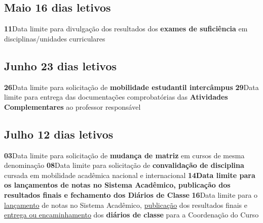 \documentclass[thesis]{hmcposter}
\begin{document}
\begin{poster}
\subsection{Maio \hfill 16 dias letivos}\textbf{11}\qquad Data limite para divulgação dos resultados dos \textbf{exames de suficiência} em disciplinas/unidades curriculares \newline \null\subsection{Junho \hfill 23 dias letivos}\textbf{26}\qquad Data limite para solicitação de \textbf{mobilidade estudantil intercâmpus} \newline \null\textbf{29}\qquad Data limite para entrega das documentações comprobatórias das \textbf{Atividades Complementares} ao professor responsável \newline \null\subsection{Julho \hfill 12 dias letivos}\textbf{03}\qquad Data limite para solicitação de \textbf{mudança de matriz} em cursos de mesma denominação \newline \null\textbf{08}\qquad Data limite para solicitação de \textbf{convalidação de disciplina} cursada em mobilidade acadêmica nacional e internacional \newline \null\textbf{14}\qquad \textbf{Data limite para os lançamentos de notas no Sistema Acadêmico, publicação dos resultados finais e fechamento dos Diários de Classe} \newline \null\textbf{16}\qquad Data limite para o \underline{lançamento} de notas no Sistema Acadêmico, \underline{publicação} dos resultados finais e \underline{entrega ou encaminhamento} dos \textbf{diários de classe} para a Coordenação do Curso \newline \null\newpage

\end{poster}
\end{document}
